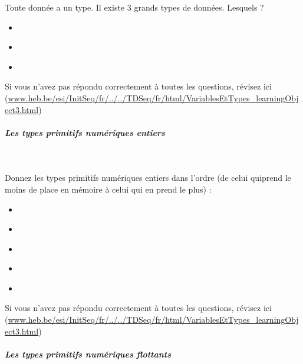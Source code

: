 \documentclass[11pt,a4paper]{article}
\begin{document}
								Toute donn\'ee a un type. Il existe 3 grands types de donn\'ees. Lesquels ?
							
					\begin{itemize}
				
			\item  \textcolor{gray}{\underline{\hspace*{16em}}} 
			\item  \textcolor{gray}{\underline{\hspace*{16em}}} 
			\item  \textcolor{gray}{\underline{\hspace*{20em}}} 
					\end{itemize}
				Si vous n'avez pas r\'epondu correctement \`a toutes les questions, 
				    r\'evisez ici (\url{www.heb.be/esi/InitSeq/fr/../../TDSeq/fr/html/VariablesEtTypes\_learningObject3.html})
            \par
        
			
		\subparagraph{Les types primitifs num\'eriques entiers} 
		
                \textcolor{white}{.} \par
             
								Donnez les types primitifs num\'eriques entiers dans l'ordre (de celui quiprend le moins de place en m\'emoire \`a celui qui en prend le plus) :
							
					\begin{itemize}
				
			\item  \textcolor{gray}{\underline{\hspace*{3em}}} 
			\item  \textcolor{gray}{\underline{\hspace*{3em}}} 
			\item  \textcolor{gray}{\underline{\hspace*{3em}}} 
			\item  \textcolor{gray}{\underline{\hspace*{2em}}} 
			\item  \textcolor{gray}{\underline{\hspace*{3em}}} 
					\end{itemize}
				Si vous n'avez pas r\'epondu correctement \`a toutes les questions, 
				    r\'evisez ici (\url{www.heb.be/esi/InitSeq/fr/../../TDSeq/fr/html/VariablesEtTypes\_learningObject3.html})
            \par
        
			
		\subparagraph{Les types primitifs num\'eriques flottants} 
		
\end{document}
